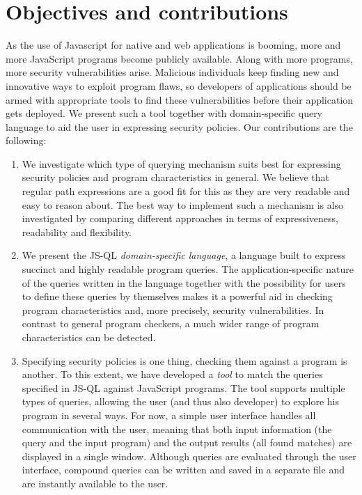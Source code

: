 \section{Objectives and contributions}
As the use of Javascript for native and web applications is booming, more and more JavaScript programs become publicly available. Along with more programs, more security vulnerabilities arise. Malicious individuals keep finding new and innovative ways to exploit program flaws, so developers of applications should be armed with appropriate tools to find these vulnerabilities before their application gets deployed. We present such a tool together with domain-specific query language to aid the user in expressing security policies. Our contributions are the following:
\begin{enumerate}
\item We investigate which type of querying mechanism suits best for expressing security policies and program characteristics in general. We believe that regular path expressions are a good fit for this as they are very readable and easy to reason about. The best way to implement such a mechanism is also investigated by comparing different approaches in terms of expressiveness, readability and flexibility.
\item We present the JS-QL \textit{domain-specific language}, a language built to express succinct and highly readable program queries. The application-specific nature of the queries written in the language together with the possibility for users to define these queries by themselves makes it a powerful aid in checking program characteristics and, more precisely, security vulnerabilities. In contrast to general program checkers, a much wider range of program characteristics can be detected.
\item Specifying security policies is one thing, checking them against a program is another. To this extent, we have developed a \textit{tool} to match the queries specified in JS-QL against JavaScript programs. The tool supports multiple types of queries, allowing the user (and thus also developer) to explore his program in several ways. For now, a simple user interface handles all communication with the user, meaning that both input information (the query and the input program) and the output results (all found matches) are displayed in a single window. Although queries are evaluated through the user interface, compound queries can be written and saved in a separate file and are instantly available to the user.
\end{enumerate} 
